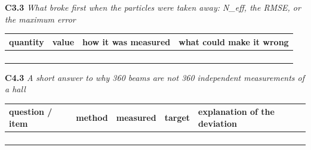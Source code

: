 \documentclass[a4paper,10pt]{article}
\begin{document}
\vspace{4pt}\noindent\textbf{C3.3} \emph{What broke first when the particles were taken away: N\_eff, the RMSE, or the maximum error}

\begin{tabular}{|>{\raggedright\hyphenpenalty 500\arraybackslash}p{4.29cm}|>{\raggedright\hyphenpenalty 500\arraybackslash}p{2.95cm}|>{\raggedright\hyphenpenalty 500\arraybackslash}p{4.29cm}|>{\raggedright\hyphenpenalty 500\arraybackslash}p{2.95cm}|}
\hline
\textbf{quantity} & \textbf{value} & \textbf{how it was measured} & \textbf{what could make it wrong} \\
\hline
\rule{0pt}{2.4em} & \rule{0pt}{2.4em} & \rule{0pt}{2.4em} & \rule{0pt}{2.4em} \\
\rule{0pt}{2.4em} & \rule{0pt}{2.4em} & \rule{0pt}{2.4em} & \rule{0pt}{2.4em} \\
\rule{0pt}{2.4em} & \rule{0pt}{2.4em} & \rule{0pt}{2.4em} & \rule{0pt}{2.4em} \\
\rule{0pt}{2.4em} & \rule{0pt}{2.4em} & \rule{0pt}{2.4em} & \rule{0pt}{2.4em} \\
\hline
\end{tabular}

\vspace{4pt}\noindent\textbf{C4.3} \emph{A short answer to why 360 beams are not 360 independent measurements of a hall}

\begin{tabular}{|>{\raggedright\hyphenpenalty 500\arraybackslash}p{2.87cm}|>{\raggedright\hyphenpenalty 500\arraybackslash}p{2.28cm}|>{\raggedright\hyphenpenalty 500\arraybackslash}p{2.87cm}|>{\raggedright\hyphenpenalty 500\arraybackslash}p{2.28cm}|>{\raggedright\hyphenpenalty 500\arraybackslash}p{3.70cm}|}
\hline
\textbf{question / item} & \textbf{method} & \textbf{measured} & \textbf{target} & \textbf{explanation of the deviation} \\
\hline
\rule{0pt}{2.4em} & \rule{0pt}{2.4em} & \rule{0pt}{2.4em} & \rule{0pt}{2.4em} & \rule{0pt}{2.4em} \\
\rule{0pt}{2.4em} & \rule{0pt}{2.4em} & \rule{0pt}{2.4em} & \rule{0pt}{2.4em} & \rule{0pt}{2.4em} \\
\rule{0pt}{2.4em} & \rule{0pt}{2.4em} & \rule{0pt}{2.4em} & \rule{0pt}{2.4em} & \rule{0pt}{2.4em} \\
\rule{0pt}{2.4em} & \rule{0pt}{2.4em} & \rule{0pt}{2.4em} & \rule{0pt}{2.4em} & \rule{0pt}{2.4em} \\
\hline
\end{tabular}
\end{document}
